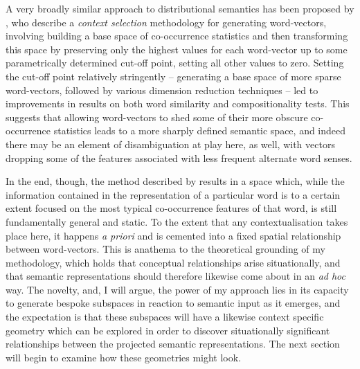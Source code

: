 A very broadly similar approach to distributional semantics has been proposed by \cite{PolajnarEA2014}, who describe a \emph{context selection} methodology for generating word-vectors, involving building a base space of co-occurrence statistics and then transforming this space by preserving only the highest values for each word-vector up to some parametrically determined cut-off point, setting all other values to zero.  Setting the cut-off point relatively stringently -- generating a base space of more sparse word-vectors, followed by various dimension reduction techniques -- led to improvements in results on both word similarity and compositionality tests.  This suggests that allowing word-vectors to shed some of their more obscure co-occurrence statistics leads to a more sharply defined semantic space, and indeed there may be an element of disambiguation at play here, as well, with vectors dropping some of the features associated with less frequent alternate word senses.

In the end, though, the method described by \citeauthor{PolajnarEA2014} results in a space which, while the information contained in the representation of a particular word is to a certain extent focused on the most typical co-occurrence features of that word, is still fundamentally general and static.  To the extent that any contextualisation takes place here, it happens \emph{a priori} and is cemented into a fixed spatial relationship between word-vectors.  This is anathema to the theoretical grounding of my methodology, which holds that conceptual relationships arise situationally, and that semantic representations should therefore likewise come about in an \emph{ad hoc} way.  The novelty, and, I will argue, the power of my approach lies in its capacity to generate bespoke subspaces in reaction to semantic input as it emerges, and the expectation is that these subspaces will have a likewise context specific geometry which can be explored in order to discover situationally significant relationships between the projected semantic representations.  The next section will begin to examine how these geometries might look.

